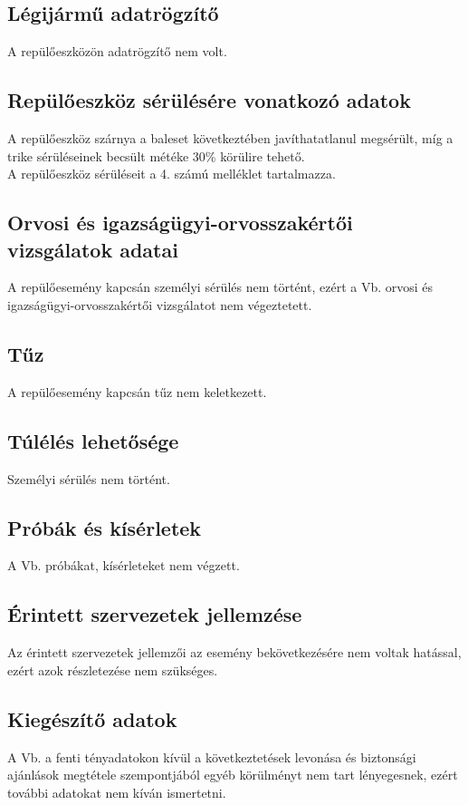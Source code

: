 \documentclass[a4paper,10pt]{article}
\begin{document}
\pagebreak
\subsection{Légijármű adatrögzítő}
A repülőeszközön adatrögzítő nem volt.

\subsection{Repülőeszköz sérülésére vonatkozó adatok}
A repülőeszköz szárnya a baleset következtében javíthatatlanul megsérült, 
míg a trike sérüléseinek becsült météke 30\% körülire tehető.\\
A repülőeszköz sérüléseit a 4. számú melléklet tartalmazza.

\subsection{Orvosi és igazságügyi-orvosszakértői vizsgálatok adatai}
A repülőesemény kapcsán személyi sérülés nem történt, ezért a Vb. orvosi és 
igazságügyi-orvosszakértői vizsgálatot nem végeztetett.

\subsection{Tűz}
A repülőesemény kapcsán tűz nem keletkezett.

\subsection{Túlélés lehetősége}
Személyi sérülés nem történt.

\subsection{Próbák és kísérletek}
A Vb. próbákat, kísérleteket nem végzett.

\subsection{Érintett szervezetek jellemzése}
Az érintett szervezetek jellemzői az esemény bekövetkezésére nem voltak 
hatással, ezért azok részletezése nem szükséges.

\subsection{Kiegészítő adatok}
A Vb. a fenti tényadatokon kívül a következtetések levonása és biztonsági 
ajánlások megtétele szempontjából egyéb körülményt nem tart lényegesnek,
ezért további adatokat nem kíván ismertetni.
\end{document}
